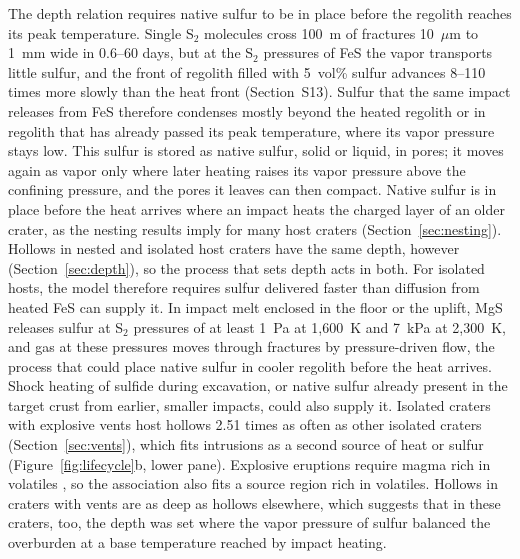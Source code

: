\documentclass[article,review]{planetary}
\begin{document}
The depth relation requires native sulfur to be in place before the regolith reaches its peak temperature. Single S$_2$ molecules cross 100~m of fractures 10~$\mu$m to 1~mm wide in 0.6--60 days, but at the S$_2$ pressures of FeS the vapor transports little sulfur, and the front of regolith filled with 5~vol\% sulfur advances 8--110 times more slowly than the heat front (Section~S13). Sulfur that the same impact releases from FeS therefore condenses mostly beyond the heated regolith or in regolith that has already passed its peak temperature, where its vapor pressure stays low. This sulfur is stored as native sulfur, solid or liquid, in pores; it moves again as vapor only where later heating raises its vapor pressure above the confining pressure, and the pores it leaves can then compact. Native sulfur is in place before the heat arrives where an impact heats the charged layer of an older crater, as the nesting results imply for many host craters (Section~\ref{sec:nesting}). Hollows in nested and isolated host craters have the same depth, however (Section~\ref{sec:depth}), so the process that sets depth acts in both. For isolated hosts, the model therefore requires sulfur delivered faster than diffusion from heated FeS can supply it. In impact melt enclosed in the floor or the uplift, MgS releases sulfur at S$_2$ pressures of at least 1~Pa at 1,600~K and 7~kPa at 2,300~K, and gas at these pressures moves through fractures by pressure-driven flow, the process that could place native sulfur in cooler regolith before the heat arrives. Shock heating of sulfide during excavation, or native sulfur already present in the target crust from earlier, smaller impacts, could also supply it. Isolated craters with explosive vents host hollows 2.51 times as often as other isolated craters (Section~\ref{sec:vents}), which fits intrusions as a second source of heat or sulfur (Figure~\ref{fig:lifecycle}b, lower pane). Explosive eruptions require magma rich in volatiles \parencite{kerber2011}, so the association also fits a source region rich in volatiles. Hollows in craters with vents are as deep as hollows elsewhere, which suggests that in these craters, too, the depth was set where the vapor pressure of sulfur balanced the overburden at a base temperature reached by impact heating.
\end{document}
